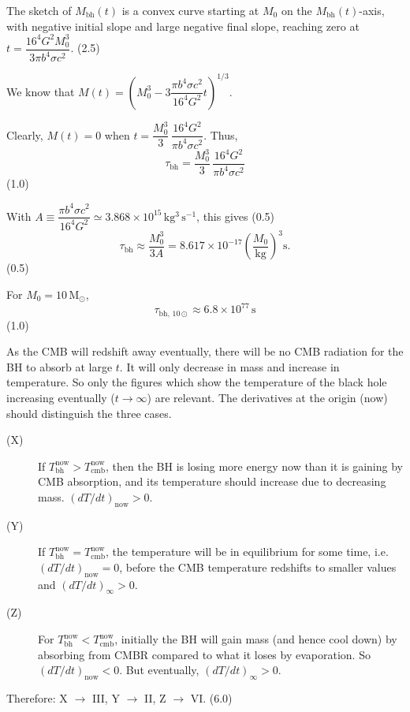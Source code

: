 \begin{description}
  The sketch of $M_{\mathrm{bh}}(t)$ is a convex curve starting at $M_0$ on
  the $M_{\mathrm{bh}}(t)$-axis, with negative initial slope and large
  negative final slope, reaching zero at
  $t = \dfrac{16^4 G^2 M_0^3}{3\pi b^4 \sigma c^2}$. \hfill(2.5)

\item[(T12.1d)] We know that
  $M(t) = \left(M_0^3 - 3\dfrac{\pi b^4 \sigma c^2}{16^4 G^2}
  t\right)^{1/3}$.

  Clearly, $M(t) = 0$ when
  $t = \dfrac{M_0^3}{3}\,\dfrac{16^4 G^2}{\pi b^4 \sigma c^2}$. Thus,
  \[
    \tau_{\mathrm{bh}} = \frac{M_0^3}{3}\,
      \frac{16^4 G^2}{\pi b^4 \sigma c^2}
  \]
  \hfill(1.0)

  With $A \equiv \dfrac{\pi b^4 \sigma c^2}{16^4 G^2}
  \simeq 3.868 \times 10^{15}\,\mathrm{kg^3\,s^{-1}}$, this gives \hfill(0.5)
  \[
    \tau_{\mathrm{bh}} \approx \frac{M_0^3}{3A}
    = 8.617 \times 10^{-17} \left(\frac{M_0}{\mathrm{kg}}\right)^3
    \mathrm{s}.
  \]
  \hfill(0.5)

  For $M_0 = 10\,\mathrm{M_\odot}$,
  \[
    \tau_{\mathrm{bh,\,10\odot}} \approx 6.8 \times 10^{77}\,\mathrm{s}
  \]
  \hfill(1.0)

\item[(T12.1e)] As the CMB will redshift away eventually, there will be no
  CMB radiation for the BH to absorb at large $t$. It will only decrease in
  mass and increase in temperature. So only the figures which show the
  temperature of the black hole increasing eventually ($t \to \infty$) are
  relevant. The derivatives at the origin (now) should distinguish the three
  cases.
  \begin{description}
  \item[(X)] If $T_{\mathrm{bh}}^{\mathrm{now}} >
    T_{\mathrm{cmb}}^{\mathrm{now}}$, then the BH is losing more energy now
    than it is gaining by CMB absorption, and its temperature should increase
    due to decreasing mass. $(dT/dt)_{\mathrm{now}} > 0$.
  \item[(Y)] If $T_{\mathrm{bh}}^{\mathrm{now}} =
    T_{\mathrm{cmb}}^{\mathrm{now}}$, the temperature will be in equilibrium
    for some time, i.e.\ $(dT/dt)_{\mathrm{now}} = 0$, before the CMB
    temperature redshifts to smaller values and $(dT/dt)_{\infty} > 0$.
  \item[(Z)] For $T_{\mathrm{bh}}^{\mathrm{now}} <
    T_{\mathrm{cmb}}^{\mathrm{now}}$, initially the BH will gain mass (and
    hence cool down) by absorbing from CMBR compared to what it loses by
    evaporation. So $(dT/dt)_{\mathrm{now}} < 0$. But eventually,
    $(dT/dt)_{\infty} > 0$.
  \end{description}
  Therefore: X $\to$ III, \quad Y $\to$ II, \quad Z $\to$ VI. \hfill(6.0)


\end{description}
